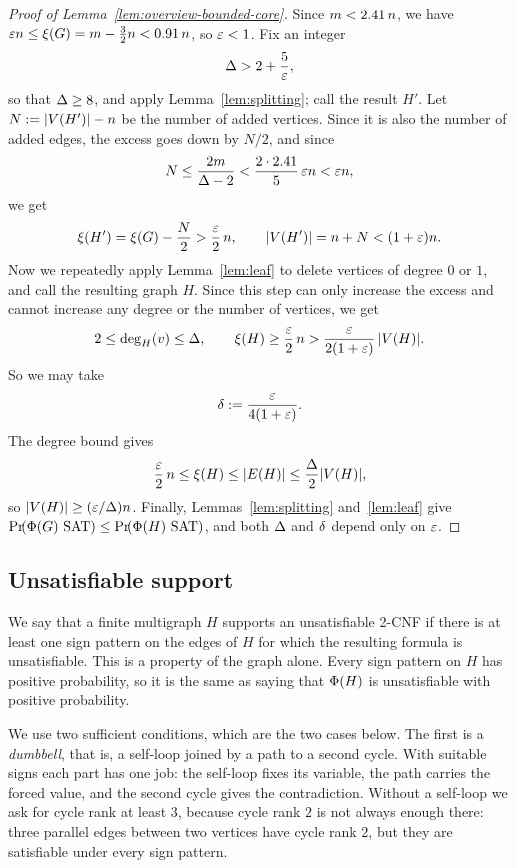 \begin{proof}[Proof of Lemma~\ref{lem:overview-bounded-core}]
Since \(m<2.41\,n\), we have
\(\varepsilon n\le\xi(G)=m-\frac32n<0.91\,n\), so
\(\varepsilon<1\). Fix an integer
\[
  \Delta>2+\frac{5}{\varepsilon} ,
\]
so that \(\Delta\ge8\), and apply Lemma~\ref{lem:splitting}; call the result
\(H'\). Let \(N:=|V(H')|-n\) be the number of added vertices. Since it is
also the number of added edges, the excess goes down by \(N/2\), and since
\[
  N\le\frac{2m}{\Delta-2}<\frac{2\cdot2.41}{5}\,\varepsilon n<\varepsilon n,
\]
we get
\[
  \xi(H')=\xi(G)-\frac N2>\frac{\varepsilon}{2}\,n,
  \qquad
  |V(H')|=n+N<(1+\varepsilon)n .
\]
Now we repeatedly apply Lemma~\ref{lem:leaf} to delete vertices of degree \(0\)
or \(1\), and call the resulting graph \(H\). Since this step can only increase
the excess and cannot increase any degree or the number of vertices, we get
\[
  2\le\deg_{H}(v)\le\Delta,
  \qquad
  \xi(H)\ge\frac{\varepsilon}{2}\,n
  >\frac{\varepsilon}{2(1+\varepsilon)}\,|V(H)| .
\]
So we may take
\[
  \delta:=\frac{\varepsilon}{4(1+\varepsilon)} .
\]
The degree bound gives
\[
  \frac{\varepsilon}{2}\,n
  \le\xi(H)
  \le |E(H)|
  \le\frac{\Delta}{2}|V(H)|,
\]
so \(|V(H)|\ge(\varepsilon/\Delta)n\). Finally,
Lemmas~\ref{lem:splitting} and~\ref{lem:leaf} give
\(\Prx{\rform{\Gin}\SAT}\le\Prx{\rform{H}\SAT}\), and both \(\Delta\) and
\(\delta\) depend only on \(\varepsilon\).
\end{proof}

\subsection{Unsatisfiable support}\label{subsec:unsat-support}

We say that a finite multigraph \(H\) supports an unsatisfiable 2-CNF if there
is at least one sign pattern on the edges of \(H\) for which the resulting
formula is unsatisfiable. This is a property of the graph alone. Every sign
pattern on \(H\) has positive probability, so it is the same as saying that
\(\Phi(H)\) is unsatisfiable with positive probability.

We use two sufficient conditions, which are the two cases below. The first is a
\emph{dumbbell}, that is, a self-loop joined by a path to a second cycle. With
suitable signs each part has one job: the self-loop fixes its variable, the
path carries the forced value, and the second cycle gives the contradiction.
Without a self-loop we ask for cycle rank at least \(3\), because cycle rank
\(2\) is not always enough there: three parallel edges between two vertices
have cycle rank \(2\), but they are satisfiable under every sign pattern.

